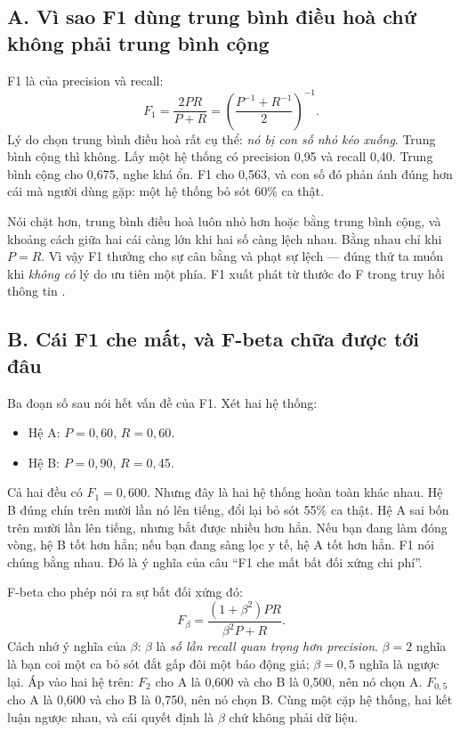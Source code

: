 \documentclass[../../deep_learning.tex]{subfiles}
\begin{document}
\subsection{A. Vì sao F1 dùng trung bình điều hoà chứ không phải trung bình cộng}
F1 là  của precision và recall:
\[
F_1 = \frac{2PR}{P+R} = \left(\frac{P^{-1}+R^{-1}}{2}\right)^{-1}.
\]
Lý do chọn trung bình điều hoà rất cụ thể: \emph{nó bị con số nhỏ kéo xuống}. Trung bình cộng thì không. Lấy một hệ thống có precision 0{,}95 và recall 0{,}40. Trung bình cộng cho 0{,}675, nghe khá ổn. F1 cho 0{,}563, và con số đó phản ánh đúng hơn cái mà người dùng gặp: một hệ thống bỏ sót 60\% ca thật.

Nói chặt hơn, trung bình điều hoà luôn nhỏ hơn hoặc bằng trung bình cộng, và khoảng cách giữa hai cái càng lớn khi hai số càng lệch nhau. Bằng nhau chỉ khi \(P = R\). Vì vậy F1 thưởng cho sự cân bằng và phạt sự lệch --- đúng thứ ta muốn khi \emph{không có} lý do ưu tiên một phía. F1 xuất phát từ thước đo F trong truy hồi thông tin \cite{vanrijsbergen1979}.

\subsection{B. Cái F1 che mất, và F-beta chữa được tới đâu}
Ba đoạn số sau nói hết vấn đề của F1. Xét hai hệ thống:
\begin{itemize}
\item Hệ A: \(P = 0{,}60\), \(R = 0{,}60\).
\item Hệ B: \(P = 0{,}90\), \(R = 0{,}45\).
\end{itemize}
Cả hai đều có \(F_1 = 0{,}600\). Nhưng đây là hai hệ thống hoàn toàn khác nhau. Hệ B đúng chín trên mười lần nó lên tiếng, đổi lại bỏ sót 55\% ca thật. Hệ A sai bốn trên mười lần lên tiếng, nhưng bắt được nhiều hơn hẳn. Nếu bạn đang làm đóng vòng, hệ B tốt hơn hẳn; nếu bạn đang sàng lọc y tế, hệ A tốt hơn hẳn. F1 nói chúng bằng nhau. Đó là ý nghĩa của câu ``F1 che mất bất đối xứng chi phí''.

F-beta cho phép nói ra sự bất đối xứng đó:
\[
F_\beta = \frac{(1+\beta^2)PR}{\beta^2 P + R}.
\]
Cách nhớ ý nghĩa của \(\beta\): \(\beta\) là \emph{số lần recall quan trọng hơn precision}. \(\beta = 2\) nghĩa là bạn coi một ca bỏ sót đắt gấp đôi một báo động giả; \(\beta = 0{,}5\) nghĩa là ngược lại. Áp vào hai hệ trên: \(F_2\) cho A là 0{,}600 và cho B là 0{,}500, nên nó chọn A. \(F_{0,5}\) cho A là 0{,}600 và cho B là 0{,}750, nên nó chọn B. Cùng một cặp hệ thống, hai kết luận ngược nhau, và cái quyết định là \(\beta\) chứ không phải dữ liệu.
\end{document}

